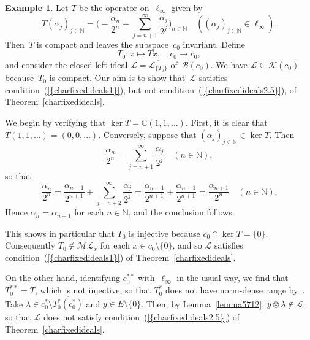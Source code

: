 \documentclass[12pt]{amsart}
\theoremstyle{definition}
\newtheorem{example}[theorem]{Example}
\numberwithin{equation}{section}
\begin{document}
\begin{example}\label{c0exampleFailureof2ndDichotomy}
  Let $T$ be the operator on~$\ell_\infty$ given by
  \begin{equation}\label{c0exampleFailureof2ndDichotomyEq1}
    T(\alpha_j)_{j\in{\ensuremath{\mathbb{N}}}} = \biggl(-\frac{\alpha_n}{2^{n}} +
    \sum_{j=n+1}^\infty \frac{\alpha_j}{2^{j}}\biggr)_{n\in{\ensuremath{\mathbb{N}}}}\quad
    ((\alpha_j)_{j\in{\ensuremath{\mathbb{N}}}}\in \ell_\infty). \end{equation} Then~$T$ is
  compact and leaves the subspace~$c_0$ invariant. Define $$T_0\colon
  x\mapsto Tx,\quad c_0\to c_0,$$ and consider the closed left ideal
  $\mathscr{L} = \overline{\mathscr{L}_{\{T_0\}}}$
  of~$\mathscr{B}(c_0)$. We have
  $\mathscr{L}\subseteq\mathscr{K}(c_0)$ because~$T_0$ is compact. Our
  aim is to show that~$\mathscr{L}$ satisfies
  condition~{{\normalfont\textrm{(\ref{{charfixedideals1}})}}}, but not
  condition~{{\normalfont\textrm{(\ref{{charfixedideals2.5}})}}}, of
  Theorem~\ref{charfixedideals}.

  We begin by verifying that $\ker T = {\ensuremath{\mathbb{C}}}(1,1,\ldots)$. First, it  is clear
  that $T(1,1,\ldots) = (0,0,\ldots)$. Conversely, suppose that
  $(\alpha_j)_{j\in{\ensuremath{\mathbb{N}}}}\in\ker T$. Then
  \[ \frac{\alpha_n}{2^{n}} = \sum_{j=n+1}^\infty
  \frac{\alpha_j}{2^{j}}\quad (n\in{\ensuremath{\mathbb{N}}}), \] so that
  \[ \frac{\alpha_n}{2^{n}} = \frac{\alpha_{n+1}}{2^{n+1}} +
  \sum_{j=n+2}^\infty \frac{\alpha_j}{2^{j}} =
  \frac{\alpha_{n+1}}{2^{n+1}} + \frac{\alpha_{n+1}}{2^{n+1}} =
  \frac{\alpha_{n+1}}{2^{n}}\quad (n\in{\ensuremath{\mathbb{N}}}). \] Hence $\alpha_n =
  \alpha_{n+1}$ for each $n\in{\ensuremath{\mathbb{N}}}$, and the conclusion follows.

  This shows in particular that $T_0$ is injective because
  $c_0\cap\ker T = \{0\}$. Consequently
  $T_0\notin\mathscr{M}\!\mathscr{L}_x$ for each $x\in
  c_0\setminus\{0\}$, and so $\mathscr{L}$ satisfies
  condition~{{\normalfont\textrm{(\ref{{charfixedideals1}})}}} of
  Theorem~\ref{charfixedideals}.

  On the other hand, identifying $c_0^{**}$ with~$\ell_\infty$ in the
  usual way, we find that $T_0^{**} = T$, which is not injective, so
  that $T_0^*$ does not have norm-dense range
  by~\cite[Theorem~3.1.17(b)]{meg}. Take $\lambda\in
  c_0^*\setminus\overline{T_0^*(c_0^*)}$ and $y\in
  E\setminus\{0\}$. Then, by Lemma~\ref{lemma5712},
  $y\otimes\lambda\notin\mathscr{L}$, so that $\mathscr{L}$ does not
  satisfy condition~{{\normalfont\textrm{(\ref{{charfixedideals2.5}})}}} of
  Theorem~\ref{charfixedideals}.
\end{example}
\end{document}
